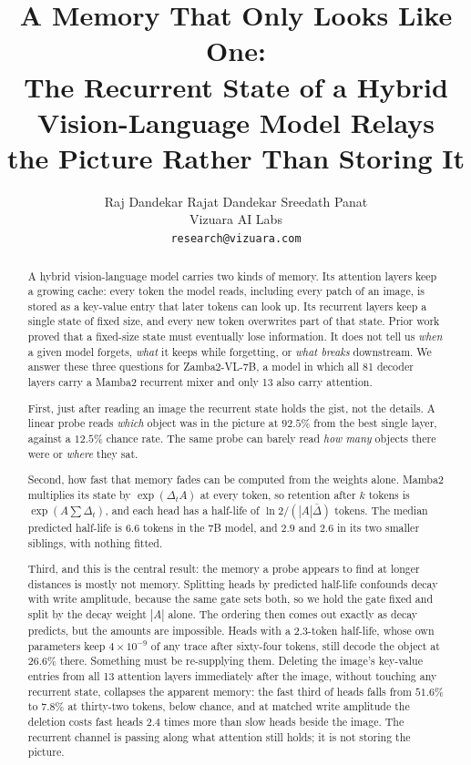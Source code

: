\documentclass[10pt]{article}
\title{\bf A Memory That Only Looks Like One:\\[2pt]
\large The Recurrent State of a Hybrid Vision-Language Model Relays\\
the Picture Rather Than Storing It}
\author{Raj Dandekar \quad Rajat Dandekar \quad Sreedath Panat\\[3pt]
Vizuara AI Labs\\
\texttt{research@vizuara.com}}
\date{}
\begin{document}
\maketitle

\begin{abstract}
\noindent
A hybrid vision-language model carries two kinds of memory. Its attention
layers keep a growing cache: every token the model reads, including every patch
of an image, is stored as a key-value entry that later tokens can look up. Its
recurrent layers keep a single state of fixed size, and every new token
overwrites part of that state. Prior work proved that a fixed-size state must
eventually lose information. It does not tell us \emph{when} a given model
forgets, \emph{what} it keeps while forgetting, or \emph{what breaks}
downstream. We answer these three questions for Zamba2-VL-7B, a model in which
all 81 decoder layers carry a Mamba2 recurrent mixer and only 13 also carry
attention.

First, just after reading an image the recurrent state holds the gist, not the
details. A linear probe reads \emph{which} object was in the picture at
$92.5\%$ from the best single layer, against a $12.5\%$ chance rate. The same
probe can barely read \emph{how many} objects there were or \emph{where} they
sat.

Second, how fast that memory fades can be computed from the weights alone.
Mamba2 multiplies its state by $\exp(\Delta_t A)$ at every token, so retention
after $k$ tokens is $\exp(A\sum\Delta_t)$, and each head has a half-life of
$\ln 2/(|A|\bar{\Delta})$ tokens. The median predicted half-life is $6.6$
tokens in the 7B model, and $2.9$ and $2.6$ in its two smaller siblings, with
nothing fitted.

Third, and this is the central result: the memory a probe appears to find at
longer distances is mostly not memory. Splitting heads by predicted half-life
confounds decay with write amplitude, because the same gate sets both, so we
hold the gate fixed and split by the decay weight $|A|$ alone. The ordering
then comes out exactly as decay predicts, but the amounts are impossible.
Heads with a $2.3$-token half-life, whose own parameters keep
$4\times10^{-9}$ of any trace after sixty-four tokens, still decode the object
at $26.6\%$ there. Something must be re-supplying them. Deleting the image's
key-value entries from all 13 attention layers immediately after the image,
without touching any recurrent state, collapses the apparent memory: the fast
third of heads falls from $51.6\%$ to $7.8\%$ at thirty-two tokens, below
chance, and at matched write amplitude the deletion costs fast heads $2.4$
times more than slow heads beside the image. The recurrent channel is passing
along what attention still holds; it is not storing the picture.


\end{abstract}
\end{document}
